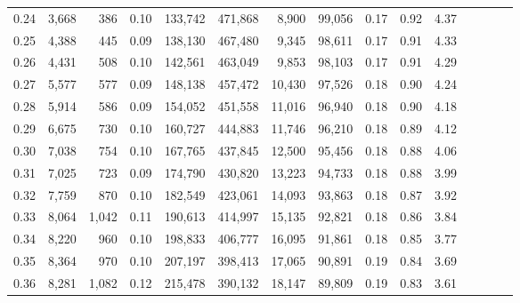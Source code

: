\begin{tabular}{rrrcrrrrrrrrrrr}
0.24 &   3,668 &    386 &                                       0.10 &  133,742 &  471,868 &    8,900 &   99,056 &  0.17 &  0.92 &                         4.37 \\
0.25 &   4,388 &    445 &                                       0.09 &  138,130 &  467,480 &    9,345 &   98,611 &  0.17 &  0.91 &                         4.33 \\
0.26 &   4,431 &    508 &                                       0.10 &  142,561 &  463,049 &    9,853 &   98,103 &  0.17 &  0.91 &                         4.29 \\
0.27 &   5,577 &    577 &                                       0.09 &  148,138 &  457,472 &   10,430 &   97,526 &  0.18 &  0.90 &                         4.24 \\
0.28 &   5,914 &    586 &                                       0.09 &  154,052 &  451,558 &   11,016 &   96,940 &  0.18 &  0.90 &                         4.18 \\
0.29 &   6,675 &    730 &                                       0.10 &  160,727 &  444,883 &   11,746 &   96,210 &  0.18 &  0.89 &                         4.12 \\
0.30 &   7,038 &    754 &                                       0.10 &  167,765 &  437,845 &   12,500 &   95,456 &  0.18 &  0.88 &                         4.06 \\
0.31 &   7,025 &    723 &                                       0.09 &  174,790 &  430,820 &   13,223 &   94,733 &  0.18 &  0.88 &                         3.99 \\
0.32 &   7,759 &    870 &                                       0.10 &  182,549 &  423,061 &   14,093 &   93,863 &  0.18 &  0.87 &                         3.92 \\
0.33 &   8,064 &  1,042 &                                       0.11 &  190,613 &  414,997 &   15,135 &   92,821 &  0.18 &  0.86 &                         3.84 \\
0.34 &   8,220 &    960 &                                       0.10 &  198,833 &  406,777 &   16,095 &   91,861 &  0.18 &  0.85 &                         3.77 \\
0.35 &   8,364 &    970 &                                       0.10 &  207,197 &  398,413 &   17,065 &   90,891 &  0.19 &  0.84 &                         3.69 \\
0.36 &   8,281 &  1,082 &                                       0.12 &  215,478 &  390,132 &   18,147 &   89,809 &  0.19 &  0.83 &                         3.61 \\

\end{tabular}
